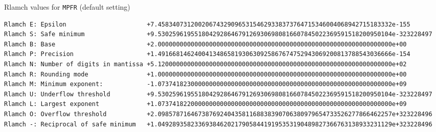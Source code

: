 \documentclass[12pt]{article}
\begin{document}
\begin{table}
\caption{Rlamch values for {\tt MPFR} (default setting) }\label{rlamchmpfr}
\begin{center}
\scriptsize
{
\begin{verbatim}
Rlamch E: Epsilon                      +7.4583407312002067432909653154629338373764715346004068942715183332e-155
Rlamch S: Safe minimum                 +9.5302596195518042928646791269306980816607845022369591518200950104e-323228497
Rlamch B: Base                         +2.0000000000000000000000000000000000000000000000000000000000000000e+00
Rlamch P: Precision                    +1.4916681462400413486581930630925867674752943069200813788543036666e-154
Rlamch N: Number of digits in mantissa +5.1200000000000000000000000000000000000000000000000000000000000000e+02
Rlamch R: Rounding mode                +1.0000000000000000000000000000000000000000000000000000000000000000e+00
Rlamch M: Minimum exponent:            -1.0737418230000000000000000000000000000000000000000000000000000000e+09
Rlamch U: Underflow threshold          +9.5302596195518042928646791269306980816607845022369591518200950104e-323228497
Rlamch L: Largest exponent             +1.0737418220000000000000000000000000000000000000000000000000000000e+09
Rlamch O: Overflow threshold           +2.0985787164673876924043581168838390706380979654733526277866462257e+323228496
Rlamch -: Reciprocal of safe minimum   +1.0492893582336938462021790584419195353190489827366763138933231129e+323228496
\end{verbatim}
}
\end{center}
\end{table}
\end{document}
